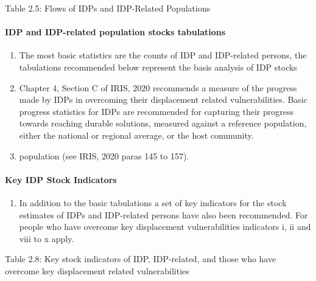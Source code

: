 \documentclass[
]{article}
\providecommand{\tightlist}{%
  \setlength{\itemsep}{0pt}\setlength{\parskip}{0pt}}
\begin{document}
Table 2.5: Flows of IDPs and IDP-Related Populations

\hypertarget{idp-and-idp-related-population-stocks-tabulations-1}{%
\paragraph{IDP and IDP-related population stocks tabulations}\label{idp-and-idp-related-population-stocks-tabulations-1}}

\begin{enumerate}
\def\labelenumi{\arabic{enumi}.}
\setcounter{enumi}{68}
\item
  The most basic statistics are the counts of IDP and IDP-related
  persons, the tabulations recommended below represent the basis
  analysis of IDP stocks
\item
  Chapter 4, Section C of IRIS, 2020 recommends a measure of the
  progress made by IDPs in overcoming their displacement related
  vulnerabilities. Basic progress statistics for IDPs are recommended
  for capturing their progress towards reaching durable solutions,
  measured against a reference population, either the national or
  regional average, or the host community.
\item
  population (see IRIS, 2020 paras 145 to 157).
\end{enumerate}

\hypertarget{section}{%
\paragraph{}\label{section}}

\hypertarget{key-idp-stock-indicators-1}{%
\paragraph{Key IDP Stock Indicators}\label{key-idp-stock-indicators-1}}

\begin{enumerate}
\def\labelenumi{\arabic{enumi}.}
\setcounter{enumi}{71}
\tightlist
\item
  In addition to the basic tabulations a set of key indicators for the
  stock estimates of IDPs and IDP-related persons have also been
  recommended. For people who have overcome key displacement
  vulnerabilities indicators i, ii and viii to x apply.
\end{enumerate}

Table 2.8: Key stock indicators of IDP, IDP-related, and those who have
overcome key displacement related vulnerabilities
\end{document}
